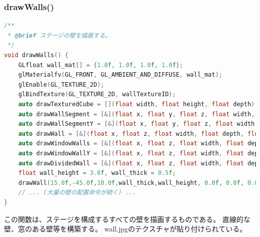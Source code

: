 \documentclass[uplatex,dvipdfmx,a4paper]{jsarticle}
\begin{document}
\hypertarget{func:drawWalls}{}\subsubsection{drawWalls()}\label{func:drawWalls}
\begin{lstlisting}[language=C++, caption={drawWalls() 関数}, label={lst:drawWalls_detail}]
/**
 * @brief ステージの壁を描画する。
 */
void drawWalls() {
    GLfloat wall_mat[] = {1.0f, 1.0f, 1.0f, 1.0f};
    glMaterialfv(GL_FRONT, GL_AMBIENT_AND_DIFFUSE, wall_mat);
    glEnable(GL_TEXTURE_2D);
    glBindTexture(GL_TEXTURE_2D, wallTextureID);
    auto drawTexturedCube = [](float width, float height, float depth) { /* ... */ };
    auto drawWallSegment = [&](float x, float y, float z, float width, float depth, float height, float rx, float ry, float rz) { /* ... */ };
    auto drawWallSegmentY = [&](float x, float y, float z, float width, float depth, float height, float rx, float ry, float rz) { /* ... */ };
    auto drawWall = [&](float x, float z, float width, float depth, float height, float rx, float ry, float rz) { /* ... */ };
    auto drawWindowWalls = [&](float x, float z, float width, float depth, float height, float rx, float ry, float rz) { /* ... */ };
    auto drawWindowWallY = [&](float x, float z, float width, float depth, float height, float rx, float ry, float rz) { /* ... */ };
    auto drawDividedWall = [&](float x, float z, float width, float depth, float height, float rx, float ry, float rz) { /* ... */ };
    float wall_height = 3.6f, wall_thick = 0.5f;
    drawWall(15.0f,-45.0f,10.0f,wall_thick,wall_height, 0.0f, 0.0f, 0.0f);
    // ... (大量の壁の配置命令が続く) ...
}
\end{lstlisting}
この関数は、ステージを構成するすべての壁を描画するものである。
直線的な壁、窓のある壁等を構築する。
wall.jpgのテクスチャが貼り付けられている。
\end{document}
